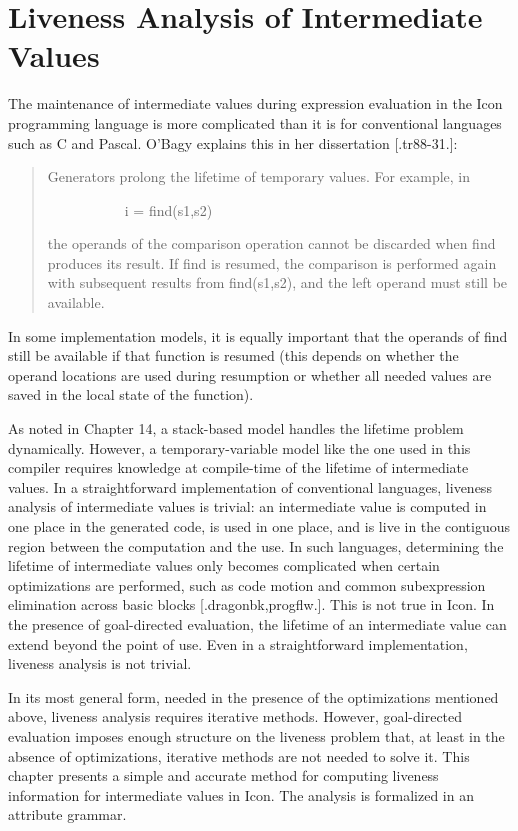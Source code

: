\chapter{Liveness Analysis of Intermediate Values}

The maintenance of intermediate values during expression evaluation in
the Icon programming language is more complicated than it is for
conventional languages such as C and Pascal. O'Bagy explains this in
her dissertation [.tr88-31.]:

\begin{quote}
{\textquotedbl}Generators prolong the lifetime of temporary values. For example, in 


\ \ \ \ \ \ \ \ \ \ \ i = find(s1,s2)

\noindent the operands of the comparison operation cannot be discarded
when find produces its result. If find is resumed, the comparison is
performed again with subsequent results from find(s1,s2), and the left
operand must still be available.{\textquotedbl}
\end{quote}

\noindent In some implementation models, it is equally important that
the operands of find still be available if that function is resumed
(this depends on whether the operand locations are used during
resumption or whether all needed values are saved in the local state
of the function).

As noted in Chapter 14, a stack-based model handles the lifetime
problem dynamically. However, a temporary-variable model like the one
used in this compiler requires knowledge at compile-time of the
lifetime of intermediate values. In a straightforward implementation
of conventional languages, liveness analysis of intermediate values is
trivial: an intermediate value is computed in one place in the
generated code, is used in one place, and is live in the contiguous
region between the computation and the use. In such languages,
determining the lifetime of intermediate values only becomes
complicated when certain optimizations are performed, such as code
motion and common subexpression elimination across basic blocks
[.dragonbk,progflw.]. This is not true in Icon. In the presence of
goal-directed evaluation, the lifetime of an intermediate value can
extend beyond the point of use. Even in a straightforward
implementation, liveness analysis is not trivial.

In its most general form, needed in the presence of the optimizations
mentioned above, liveness analysis requires iterative
methods. However, goal-directed evaluation imposes enough structure on
the liveness problem that, at least in the absence of optimizations,
iterative methods are not needed to solve it. This chapter presents a
simple and accurate method for computing liveness information for
intermediate values in Icon. The analysis is formalized in an
attribute grammar.


